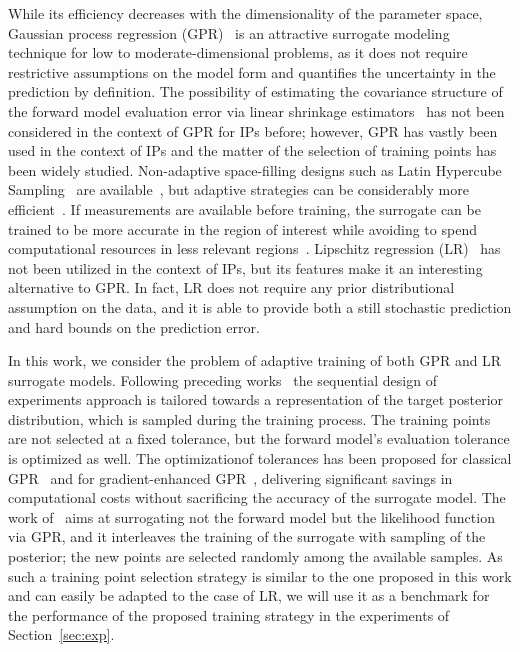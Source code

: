 While its efficiency decreases with the dimensionality of the parameter space, Gaussian process regression (GPR)~\cite{RasmussenWilliams2006} is an attractive surrogate modeling technique for low to moderate-dimensional problems, as it does not require restrictive assumptions on the model form and quantifies the uncertainty in the prediction by definition.
The possibility of estimating the covariance structure of the forward model evaluation error via linear shrinkage estimators~\cite{LedoitWolf2004b} has not been considered in the context of GPR for IPs before; however, GPR has vastly been used in the context of IPs and the matter of the selection of training points has been widely studied.
Non-adaptive space-filling designs such as Latin Hypercube Sampling~\cite{McKayBeckmanConover1979} are available~\cite{Giunta}, but adaptive strategies can be considerably more efficient~\cite{Crombecq}.
If measurements are available before training, the surrogate can be trained to be more accurate in the region of interest while avoiding to spend computational resources in less relevant regions~\cite{SinsbeckNowak2017, WangBroccardo2020}.
Lipschitz regression (LR)~\cite{ZabinskySmithKristinsdottir2003,Calliess2017} has not been utilized in the context of IPs, but its features make it an interesting alternative to GPR.
In fact, LR does not require any prior distributional assumption on the data, and it is able to provide both a still stochastic prediction and hard bounds on the prediction error.\medskip

In this work, we consider the problem of adaptive training of both GPR and LR surrogate models.
Following preceding works~\cite{VillaniUngerWeiser2024,VillaniArconesUngerWeiser2025} the sequential design of experiments approach is tailored towards a representation of the target posterior distribution, which is sampled during the training process. 
The training points are not selected at a fixed tolerance, but the forward model's evaluation tolerance is optimized as well. 
The optimizationof tolerances has been proposed for classical GPR~\cite{SemlerWeiser2023} and for gradient-enhanced GPR~\cite{SemlerWeiser2024}, delivering significant savings in computational costs without sacrificing the accuracy of the surrogate model.
The work of~\cite{Dinkel2024} aims at surrogating not the forward model but the likelihood function via GPR, and it interleaves the training of the surrogate with sampling of the posterior; the new points are selected randomly among the available samples. 
As such a training point selection strategy is similar to the one proposed in this work and can easily be adapted to the case of LR, we will use it as a benchmark for the performance of the proposed training strategy in the experiments of Section~\ref{sec:exp}.